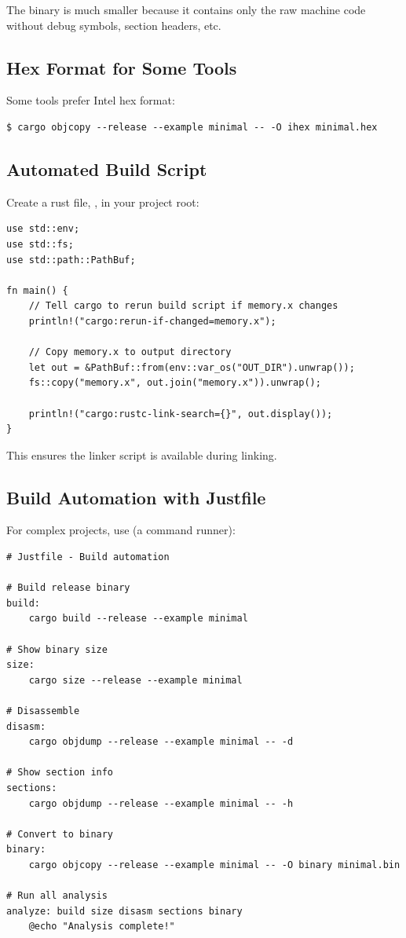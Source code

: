 The binary is much smaller because it contains only the raw machine code without debug symbols, section headers, etc.
\subsection{Hex Format for Some Tools}
Some tools prefer Intel hex format:
\begin{verbatim}
$ cargo objcopy --release --example minimal -- -O ihex minimal.hex
\end{verbatim}

\subsection{Automated Build Script}
\label{sec:automated-build}

Create a rust file, , in your project root:
\begin{verbatim}
use std::env;
use std::fs;
use std::path::PathBuf;

fn main() {
    // Tell cargo to rerun build script if memory.x changes
    println!("cargo:rerun-if-changed=memory.x");

    // Copy memory.x to output directory
    let out = &PathBuf::from(env::var_os("OUT_DIR").unwrap());
    fs::copy("memory.x", out.join("memory.x")).unwrap();

    println!("cargo:rustc-link-search={}", out.display());
}
\end{verbatim}

This ensures the linker script is available during linking.

\subsection{Build Automation with Justfile}
\label{sec:justfile}

For complex projects, use  (a command runner):
\begin{verbatim}
# Justfile - Build automation

# Build release binary
build:
    cargo build --release --example minimal

# Show binary size
size:
    cargo size --release --example minimal

# Disassemble
disasm:
    cargo objdump --release --example minimal -- -d

# Show section info
sections:
    cargo objdump --release --example minimal -- -h

# Convert to binary
binary:
    cargo objcopy --release --example minimal -- -O binary minimal.bin

# Run all analysis
analyze: build size disasm sections binary
    @echo "Analysis complete!"
\end{verbatim}

